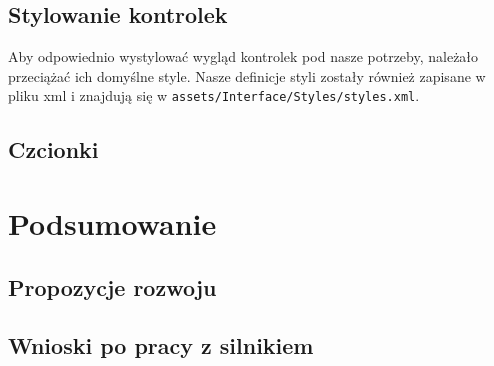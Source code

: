\documentclass[]{report}
\newcommand{\code}[1]{\colorbox{codegray}{\texttt{#1}}}
\begin{document}
\section{Stylowanie kontrolek}
Aby odpowiednio wystylować wygląd kontrolek pod nasze potrzeby, należało przeciążać ich domyślne style. Nasze definicje styli zostały również zapisane w pliku xml i znajdują się w \code{assets/Interface/Styles/styles.xml}.

\section{Czcionki} 


\chapter*{Podsumowanie}
\section{Propozycje rozwoju}
\section{Wnioski po pracy z silnikiem}
\end{document}
